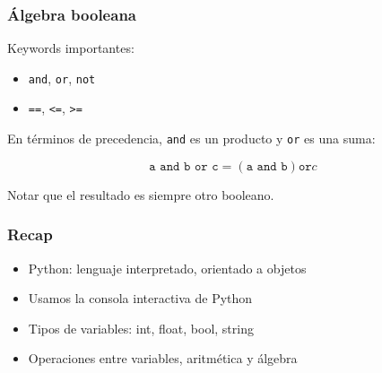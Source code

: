 \documentclass[14pt,aspectratio=169,xcolor=dvipsnames]{beamer}
\begin{document}
\begin{frame}\frametitle{Álgebra booleana}
    Keywords importantes: 
    \begin{itemize}
        \item \texttt{and}, \texttt{or}, \texttt{not}
        \item \texttt{==}, \texttt{<=}, \texttt{>=}
    \end{itemize}

En términos de precedencia, \texttt{and} es un producto y \texttt{or} es una suma: 

$$ \texttt{a and b or c} = (\texttt{a and b}) \texttt{or} c $$

Notar que el resultado es siempre otro booleano.
\end{frame}
\begin{frame}\frametitle{Recap}
    \begin{itemize}
        \item Python: lenguaje interpretado, orientado a objetos
        \item Usamos la consola interactiva de Python
        \item Tipos de variables: int, float, bool, string
        \item Operaciones entre variables, aritmética y álgebra
    \end{itemize}
\end{frame}
\begin{frame}
    \maketitle
\end{frame}
\end{document}

